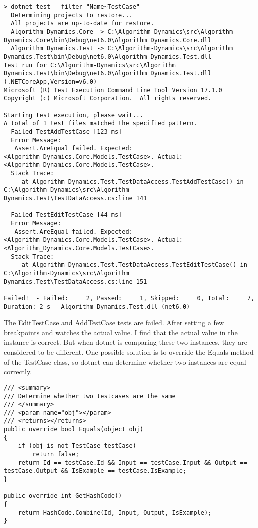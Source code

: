 \documentclass[report.tex]{subfiles}
\begin{document}
\begin{verbatim}
> dotnet test --filter "Name~TestCase"
  Determining projects to restore...
  All projects are up-to-date for restore.
  Algorithm Dynamics.Core -> C:\Algorithm-Dynamics\src\Algorithm Dynamics.Core\bin\Debug\net6.0\Algorithm Dynamics.Core.dll
  Algorithm Dynamics.Test -> C:\Algorithm-Dynamics\src\Algorithm Dynamics.Test\bin\Debug\net6.0\Algorithm Dynamics.Test.dll
Test run for C:\Algorithm-Dynamics\src\Algorithm Dynamics.Test\bin\Debug\net6.0\Algorithm Dynamics.Test.dll (.NETCoreApp,Version=v6.0)
Microsoft (R) Test Execution Command Line Tool Version 17.1.0
Copyright (c) Microsoft Corporation.  All rights reserved.

Starting test execution, please wait...
A total of 1 test files matched the specified pattern.
  Failed TestAddTestCase [123 ms]
  Error Message:
   Assert.AreEqual failed. Expected:<Algorithm_Dynamics.Core.Models.TestCase>. Actual:<Algorithm_Dynamics.Core.Models.TestCase>.
  Stack Trace:
     at Algorithm_Dynamics.Test.TestDataAccess.TestAddTestCase() in C:\Algorithm-Dynamics\src\Algorithm Dynamics.Test\TestDataAccess.cs:line 141

  Failed TestEditTestCase [44 ms]
  Error Message:
   Assert.AreEqual failed. Expected:<Algorithm_Dynamics.Core.Models.TestCase>. Actual:<Algorithm_Dynamics.Core.Models.TestCase>.
  Stack Trace:
     at Algorithm_Dynamics.Test.TestDataAccess.TestEditTestCase() in C:\Algorithm-Dynamics\src\Algorithm Dynamics.Test\TestDataAccess.cs:line 151

Failed!  - Failed:     2, Passed:     1, Skipped:     0, Total:     7, Duration: 2 s - Algorithm Dynamics.Test.dll (net6.0)
\end{verbatim}

The EditTestCase and AddTestCase tests are failed. After setting a few breakpoints and watches the actual value. I find that the actual value in the instance is correct. But when dotnet is comparing these two instances, they are considered to be different. One possible solution is to override the Equals method of the TestCase class, so dotnet can determine whether two instances are equal correctly.

\begin{verbatim}
/// <summary>
/// Determine whether two testcases are the same
/// </summary>
/// <param name="obj"></param>
/// <returns></returns>
public override bool Equals(object obj)
{
    if (obj is not TestCase testCase)
        return false;
    return Id == testCase.Id && Input == testCase.Input && Output == testCase.Output && IsExample == testCase.IsExample;
}

public override int GetHashCode()
{
    return HashCode.Combine(Id, Input, Output, IsExample);
}
\end{verbatim}
\end{document}
